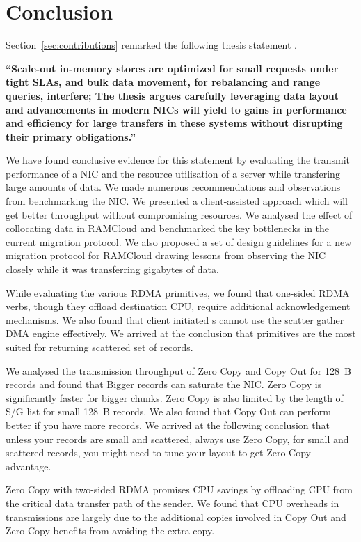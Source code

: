 
\chapter{Conclusion}
\label{chap:conclusion}
Section~\ref{sec:contributions} remarked the following thesis statement .

\textbf{\enquote{Scale-out in-memory stores are optimized for small requests
under tight SLAs, and bulk data movement, for rebalancing and range queries, interfere;
The thesis argues carefully leveraging data layout and advancements in modern NICs
will yield to gains in performance and efficiency for large transfers in these systems
without disrupting their primary obligations.}}

We have found conclusive evidence for this statement by evaluating the transmit performance 
of a NIC and the resource utilisation of a server while transfering large amounts of data. We 
made numerous recommendations and observations from benchmarking the NIC. We presented a client-assisted 
approach which will get better throughput without compromising resources. We analysed the effect of collocating
data in RAMCloud and benchmarked the key bottlenecks in the current migration protocol. We also proposed a set of design 
guidelines for a new migration protocol for RAMCloud drawing lessons from observing the NIC closely while it was 
transferring gigabytes of data. 

While evaluating the various RDMA primitives, we found that one-sided RDMA verbs, though they offload destination CPU, 
require additional acknowledgement mechanisms. We also found that client initiated s cannot use the 
scatter gather DMA engine effectively. We arrived at the conclusion that  primitives 
are the most suited for returning scattered set of records.

We analysed the transmission throughput of Zero Copy and Copy Out for 128~B records and found that Bigger records can saturate the NIC.
Zero Copy is significantly faster for bigger chunks. Zero Copy is also limited by the length of S/G list for small 128~B records.
We also found that Copy Out can perform better if you have more records. We arrived at the following conclusion that 
unless your records are small and scattered, always use Zero Copy, for small and scattered records, you might need to tune your layout 
to get Zero Copy advantage.

Zero Copy with two-sided RDMA promises CPU savings by offloading CPU from the critical data transfer path of the sender. We found that 
CPU overheads in transmissions are largely due to the additional copies involved in Copy Out and Zero Copy benefits from avoiding the extra copy.
 
